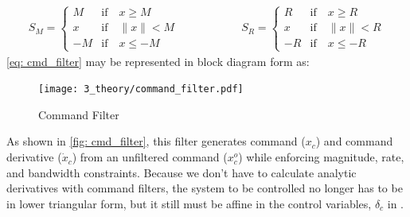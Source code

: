 \documentclass[12pt]{ucthesis}
\begin{document}
	\begin{equation} \label{eq: cmd_filter_sm_sr}
		\begin{array}{ccc}
			S_M = 	\begin{cases}
						 M &\text{if} \quad x\geq M \\
						 x &\text{if} \quad \|x\| < M\\
						-M &\text{if} \quad x\leq -M
					\end{cases} & \qquad \qquad &
			S_R = 	\begin{cases}
						 R &\text{if} \quad x\geq R \\
						 x &\text{if} \quad \|x\| < R \\
						-R &\text{if} \quad x\leq -R
					\end{cases}
		\end{array}
	\end{equation}
\autoref{eq: cmd_filter} may be represented in block diagram form as:
	\begin{figure}[H]
	\centering
	\texttt{[image: 3\_theory/command\_filter.pdf]}
	\caption{Command Filter \citep{Farrell2005}}
	\label{fig: cmd_filter}
	\end{figure}
As shown in \autoref{fig: cmd_filter}, this filter generates command ($x_c$) and command derivative ($\dot{x}_c$) from an unfiltered command ($x^o_c$) while enforcing magnitude, rate, and bandwidth constraints. Because we don't have to calculate analytic derivatives with command filters, the system to be controlled no longer has to be in lower triangular form, but it still must be affine in the control variables, $\delta_c$ in .
\end{document}
